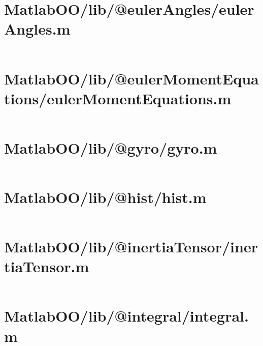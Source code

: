 \pagebreak
\section*{MatlabOO/lib/@eulerAngles/eulerAngles.m}\label{code:MatlabOO/lib/@eulerAngles/eulerAngles.m}
\inputminted[linenos,fontsize=\scriptsize]{matlab}{/home/dcouture/git/mathyourlife/TSatPy/beta_versions/matlab_object_oriented/lib/@eulerAngles/eulerAngles.m}

\pagebreak
\section*{MatlabOO/lib/@eulerMomentEquations/eulerMomentEquations.m}\label{code:MatlabOO/lib/@eulerMomentEquations/eulerMomentEquations.m}
\inputminted[linenos,fontsize=\scriptsize]{matlab}{/home/dcouture/git/mathyourlife/TSatPy/beta_versions/matlab_object_oriented/lib/@eulerMomentEquations/eulerMomentEquations.m}

\pagebreak
\section*{MatlabOO/lib/@gyro/gyro.m}\label{code:MatlabOO/lib/@gyro/gyro.m}
\inputminted[linenos,fontsize=\scriptsize]{matlab}{/home/dcouture/git/mathyourlife/TSatPy/beta_versions/matlab_object_oriented/lib/@gyro/gyro.m}

\pagebreak
\section*{MatlabOO/lib/@hist/hist.m}\label{code:MatlabOO/lib/@hist/hist.m}
\inputminted[linenos,fontsize=\scriptsize]{matlab}{/home/dcouture/git/mathyourlife/TSatPy/beta_versions/matlab_object_oriented/lib/@hist/hist.m}

\pagebreak
\section*{MatlabOO/lib/@inertiaTensor/inertiaTensor.m}\label{code:MatlabOO/lib/@inertiaTensor/inertiaTensor.m}
\inputminted[linenos,fontsize=\scriptsize]{matlab}{/home/dcouture/git/mathyourlife/TSatPy/beta_versions/matlab_object_oriented/lib/@inertiaTensor/inertiaTensor.m}

\pagebreak
\section*{MatlabOO/lib/@integral/integral.m}\label{code:MatlabOO/lib/@integral/integral.m}
\inputminted[linenos,fontsize=\scriptsize]{matlab}{/home/dcouture/git/mathyourlife/TSatPy/beta_versions/matlab_object_oriented/lib/@integral/integral.m}

